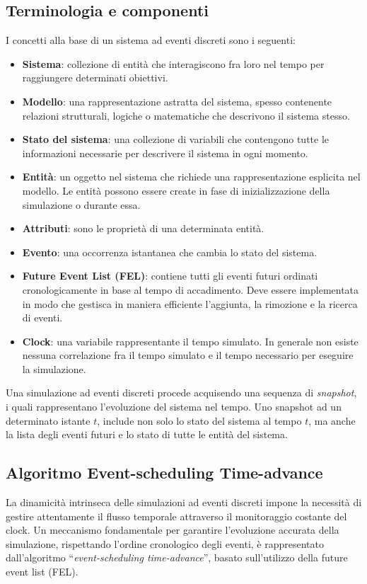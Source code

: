 \documentclass[12pt,a4paper,openright,twoside]{book}
\begin{document}
\subsection{Terminologia e componenti}
I concetti alla base di un sistema ad eventi discreti sono i seguenti: 
\begin{itemize}
    \item \textbf{Sistema}: collezione di entità che interagiscono fra loro nel tempo per raggiungere determinati obiettivi.
    \item \textbf{Modello}: una rappresentazione astratta del sistema, spesso contenente relazioni strutturali, logiche o matematiche che descrivono il sistema stesso.
    \item \textbf{Stato del sistema}: una collezione di variabili che contengono tutte le informazioni necessarie per descrivere il sistema in ogni momento.
    \item \textbf{Entità}: un oggetto nel sistema che richiede una rappresentazione esplicita nel modello. Le entità possono essere create in fase di inizializzazione della simulazione o durante essa. 
    \item \textbf{Attributi}: sono le proprietà di una determinata entità.
    \item \textbf{Evento}: una occorrenza istantanea che cambia lo stato del sistema. 
    \item \textbf{Future Event List (FEL)}: contiene tutti gli eventi futuri ordinati cronologicamente in base al tempo di accadimento. Deve essere implementata in modo che gestisca in maniera efficiente l'aggiunta, la rimozione e la ricerca di eventi. 
    \item \textbf{Clock}: una variabile rappresentante il tempo simulato. In generale non esiste nessuna correlazione fra il tempo simulato e il tempo necessario per eseguire la simulazione. 
\end{itemize}
Una simulazione ad eventi discreti procede acquisendo una sequenza di \textit{snapshot}, i quali rappresentano l'evoluzione del sistema nel tempo. Uno snapshot ad un determinato istante $t$, include non solo lo stato del sistema al tempo $t$, ma anche la lista degli eventi futuri e lo stato di tutte le entità del sistema.

\subsection{Algoritmo Event-scheduling Time-advance}
\label{sec:time-advance-algorithm}
La dinamicità intrinseca delle simulazioni ad eventi discreti impone la necessità di gestire attentamente il flusso temporale attraverso il monitoraggio costante del clock. 
Un meccanismo fondamentale per garantire l'evoluzione accurata della simulazione, rispettando l'ordine cronologico degli eventi, è rappresentato dall'algoritmo ``\textit{event-scheduling time-advance}'', basato sull'utilizzo della future event list (FEL).
\end{document}
